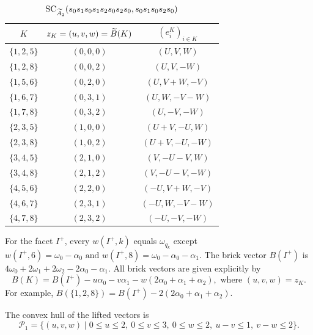 \begin{table}[htbp]
\centering
\caption{$\operatorname{SC}_{\widetilde A_2}(s_0s_1s_0s_1s_2s_0s_2s_0,s_0s_1s_0s_2s_0)$}
\label{tab:int-base}
\medskip
\begin{tabular}{@{}ccc@{}}
\toprule
$K$ & $z_K=(u,v,w)=\widetilde B(K)$ & $(e_i^K)_{i\in K}$\\
\midrule
$\{1,2,5\}$ & $(0,0,0)$ & $(U,V,W)$\\
$\{1,2,8\}$ & $(0,0,2)$ & $(U,V,-W)$\\
$\{1,5,6\}$ & $(0,2,0)$ & $(U,V+W,-V)$\\
$\{1,6,7\}$ & $(0,3,1)$ & $(U,W,-V-W)$\\
$\{1,7,8\}$ & $(0,3,2)$ & $(U,-V,-W)$\\
$\{2,3,5\}$ & $(1,0,0)$ & $(U+V,-U,W)$\\
$\{2,3,8\}$ & $(1,0,2)$ & $(U+V,-U,-W)$\\
$\{3,4,5\}$ & $(2,1,0)$ & $(V,-U-V,W)$\\
$\{3,4,8\}$ & $(2,1,2)$ & $(V,-U-V,-W)$\\
$\{4,5,6\}$ & $(2,2,0)$ & $(-U,V+W,-V)$\\
$\{4,6,7\}$ & $(2,3,1)$ & $(-U,W,-V-W)$\\
$\{4,7,8\}$ & $(2,3,2)$ & $(-U,-V,-W)$\\
\bottomrule
\end{tabular}
\end{table}


For the facet $I^+$, every $w(I^+,k)$ equals $\omega_{q_k}$ except $w(I^+,6)=\omega_0-\alpha_0 \text{ and } w(I^+,8)=\omega_0-\alpha_0-\alpha_1$. The brick vector $B(I^+)$ is $4\omega_0+2\omega_1+2\omega_2-2\alpha_0-\alpha_1$.
All brick vectors are given explicitly by
\begin{equation}\label{eq:int-affine-B}
B(K)=B(I^+)-u\alpha_0-v\alpha_1-w(2\alpha_0+\alpha_1+\alpha_2),
\text{ where } (u,v,w)=z_K.
\end{equation}
For example, $B(\{1,2,8\})=B(I^+)-2(2\alpha_0+\alpha_1+\alpha_2)$.

The convex hull of the lifted vectors is
\begin{equation}\label{eq:int-R}
\mathcal P_1=
\{(u,v,w)\mid 0\leq u\leq2,\ 0\leq v\leq3,\ 0\leq w\leq2,\
u-v\leq1,\ v-w\leq2\}.
\end{equation}


